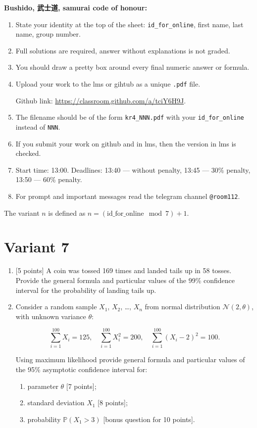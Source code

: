 \documentclass[12pt]{article}
\def \cN{\mathcal{N}}
\def \P{\mathbb{P}}
\newcommand \id {\mathrm{id}\_\mathrm{for}\_\mathrm{online}}
\begin{document}
\textbf{Bushido, 武士道, samurai code of honour:}

\vspace{5mm}

\begin{enumerate}
\item State your identity at the top of the sheet: \verb|id_for_online|, first name, last name, group number.
\item Full solutions are required, answer without explanations is not graded. 
\item You should draw a pretty box around every final numeric answer or formula.
\item Upload your work to the lms or gihtub as a unique \verb|.pdf| file.

Github link: \url{https://classroom.github.com/a/tciY6H9J}.
\item The filename should be of the form \verb|kr4_NNN.pdf| with your \verb|id_for_online| instead of \verb|NNN|.
\item If you submit your work on github and in lms, then the version in lms is checked.
\item Start time: 13:00. Deadlines: 13:40 — without penalty, 13:45 — 30\% penalty, 13:50 — 60\% penalty.
\item For prompt and important messages read the telegram channel \verb|@room112|.
\end{enumerate}


\newpage

The variant $n$ is defined as $n=(\id \mod 7)+1$. 


\section*{Variant 7}
\begin{enumerate}

\item {[5 points]} A coin was tossed 169 times and landed tails up in 58 tosses.
Provide the general formula and particular values
of the 99\% confidence interval for the probability of landing tails up.

\item Consider a random sample $X_1$, $X_2$, \ldots, $X_n$ from normal distribution $\cN(2, \theta)$, 
with unknown variance $\theta$:

\[
\sum_{i=1}^{100} X_i = 125, \quad \sum_{i=1}^{100} X_i^2 = 200, \quad \sum_{i=1}^{100} (X_i - 2)^2 = 100.  
\]

Using maximum likelihood 
provide general formula and particular values
of the 95\% asymptotic confidence interval for:

\begin{enumerate}
  \item parameter $\theta$ {[7 points]};
  \item standard deviation $X_1$ {[8 points]};
  \item probability $\P(X_1 > 3)$ {[bonus question for 10 points]}.
\end{enumerate}

\end{enumerate}
\end{document}
